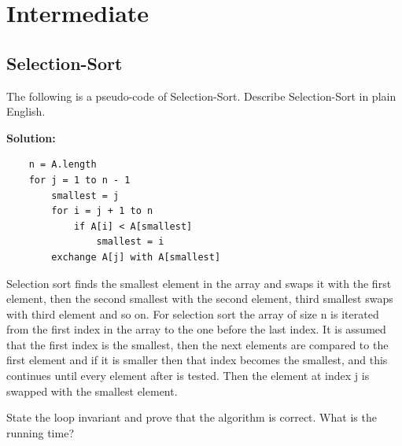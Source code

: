 \documentclass[11pt,fleqn]{book}
\begin{document}
\section{Intermediate}
\subsection{Selection-Sort}
\begin{example}
 The following is a pseudo-code of Selection-Sort.  Describe Selection-Sort in plain English.
\end{example}
\textbf{Solution:} 
 \begin{lstlisting}
    n = A.length 
    for j = 1 to n - 1 
        smallest = j 
        for i = j + 1 to n 
            if A[i] < A[smallest] 
                smallest = i 
        exchange A[j] with A[smallest]
    \end{lstlisting} 
    Selection sort finds the smallest element in the array and swaps it with the first element, then the second smallest with the second element, third smallest swaps with third element and so on. 
    \vspace{1em}
        For selection sort the array of size n is iterated from the first index in the array to the one before the last index. It is assumed that the first index is the smallest, then the next elements are compared to the first element and if it is smaller then that index becomes the smallest, and this continues until every element after is tested. Then the element at index j is swapped with the smallest element.  
\begin{example}
State the loop invariant and prove that the algorithm is correct. What is the running time?
\end{example}
\end{document}
